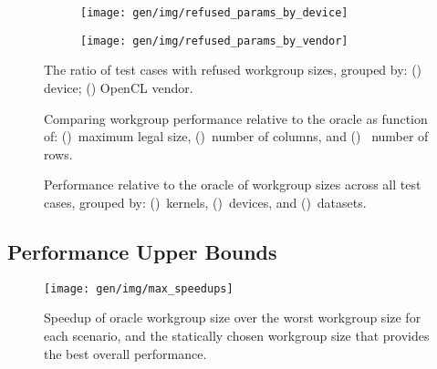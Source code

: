 \begin{figure}
\centering
\begin{subfigure}[h]{.45\textwidth}
  \centering
  \texttt{[image: gen/img/refused\_params\_by\_device]}
  \caption{}
  \label{fig:refused-params-by-device}
\end{subfigure}
\hfill
\begin{subfigure}[h]{.45\textwidth}
  \centering
  \texttt{[image: gen/img/refused\_params\_by\_vendor]}
  \caption{}
  \label{fig:refused-params-by-vendor}
\end{subfigure}
\caption{%
  The ratio of test cases with refused workgroup sizes, grouped by:
  () device;
  () OpenCL vendor.%
}
\label{fig:refused-params-by-dev-vendor}
\end{figure}



\cleardoublepage
\begin{figure}

\caption{%
  Comparing workgroup performance relative to the oracle as function
  of: ()~maximum legal size,
  ()~number of columns, and
  ()~ number of rows.%
}
\label{fig:performance-wgsizes}
\end{figure}

\begin{figure}

\caption{%
  Performance relative to the oracle of workgroup sizes across all
  test cases, grouped by: ()~kernels,
  ()~devices, and
  ()~datasets.%
}
\label{fig:performances}
\end{figure}


\subsection{Performance Upper Bounds}

\begin{figure}
\texttt{[image: gen/img/max\_speedups]}
\caption{%
  Speedup of oracle workgroup size over the worst workgroup size for
  each scenario, and the statically chosen workgroup size that
  provides the best overall performance.%
}
\label{fig:speedups}
\end{figure}

